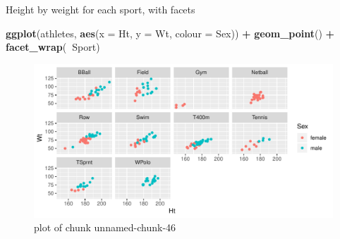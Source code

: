 \documentclass[
  ignorenonframetext,
]{beamer}
\newenvironment{Shaded}{\begin{snugshade}}{\end{snugshade}}
\newcommand{\DataTypeTok}[1]{\textcolor[rgb]{0.13,0.29,0.53}{#1}}
\newcommand{\KeywordTok}[1]{\textcolor[rgb]{0.13,0.29,0.53}{\textbf{#1}}}
\newcommand{\NormalTok}[1]{#1}
\newcommand{\OperatorTok}[1]{\textcolor[rgb]{0.81,0.36,0.00}{\textbf{#1}}}
\newcommand{\StringTok}[1]{\textcolor[rgb]{0.31,0.60,0.02}{#1}}
\begin{document}
\begin{frame}[fragile]{Height by weight for each sport, with facets}
\protect\hypertarget{height-by-weight-for-each-sport-with-facets}{}

\begin{Shaded}
\begin{Highlighting}[]
\KeywordTok{ggplot}\NormalTok{(athletes, }\KeywordTok{aes}\NormalTok{(}\DataTypeTok{x =}\NormalTok{ Ht, }\DataTypeTok{y =}\NormalTok{ Wt, }\DataTypeTok{colour =}\NormalTok{ Sex)) }\OperatorTok{+}
\StringTok{  }\KeywordTok{geom_point}\NormalTok{() }\OperatorTok{+}\StringTok{ }\KeywordTok{facet_wrap}\NormalTok{(}\OperatorTok{~}\NormalTok{Sport)}
\end{Highlighting}
\end{Shaded}

\begin{figure}
\centering
\includegraphics{figure/unnamed-chunk-46-1.pdf}
\caption{plot of chunk unnamed-chunk-46}
\end{figure}

\end{frame}
\end{document}

